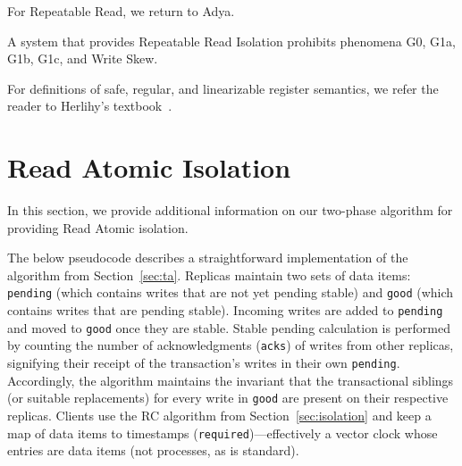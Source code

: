 For Repeatable Read, we return to Adya.

\begin{definition}
A system that provides Repeatable Read Isolation prohibits phenomena
G0, G1a, G1b, G1c, and Write Skew.
\end{definition}

For definitions of safe, regular, and linearizable register semantics,
we refer the reader to Herlihy's textbook~\cite{herlihy-art}.

\section{Read Atomic Isolation}

In this section, we provide additional information on our two-phase
algorithm for providing Read Atomic isolation.

The below pseudocode describes a straightforward implementation of the
algorithm from Section~\ref{sec:ta}. Replicas maintain two sets of
data items: \texttt{pending} (which contains writes that are not yet
pending stable) and \texttt{good} (which contains writes that are
pending stable). Incoming writes are added to \texttt{pending} and
moved to \texttt{good} once they are stable. Stable pending
calculation is performed by counting the number of acknowledgments
(\texttt{acks}) of writes from other replicas, signifying their
receipt of the transaction's writes in their
own \texttt{pending}. Accordingly, the algorithm maintains the
invariant that the transactional siblings (or suitable replacements)
for every write in \texttt{good} are present on their respective
replicas. Clients use the RC algorithm from
Section~\ref{sec:isolation} and keep a map of data items to timestamps
(\texttt{required})---effectively a vector clock whose entries are
data items (not processes, as is standard).

